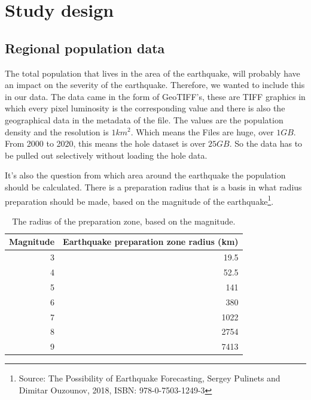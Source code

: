 \documentclass[a4paper]{article}
\begin{document}

\section{Study design}

\subsection{Regional population data}

The total population that lives in the area of the earthquake, will probably have an impact on the severity of the earthquake. Therefore, we wanted to include this in our data. The data came in the form of GeoTIFF's, these are TIFF graphics in which every pixel luminosity is the corresponding value and there is also the geographical data in the metadata of the file. The values are the population density and the resolution is $1 km^2$. Which means the Files are huge, over $1 GB$. From 2000 to 2020, this means the hole dataset is over $25 GB$. So the data has to be pulled out selectively without loading the hole data.

It's also the question from which area around the earthquake the population should be calculated. There is a preparation radius that is a basis in what radius preparation should be made, based on the magnitude of the earthquake\footnote{Source: The Possibility of Earthquake Forecasting, Sergey Pulinets and Dimitar Ouzounov, 2018, ISBN: 978-0-7503-1249-3}.

\begin{table}[h]
    \centering
    \caption{The radius of the preparation zone, based on the magnitude.}
    \label{tab:preperation_radius}
    \begin{tabular}{|r|r|}
    \hline
    Magnitude & Earthquake preparation zone radius (km) \\ \hline
    3         & 19.5                                    \\ \hline
    4         & 52.5                                    \\ \hline
    5         & 141                                     \\ \hline
    6         & 380                                     \\ \hline
    7         & 1022                                    \\ \hline
    8         & 2754                                    \\ \hline
    9         & 7413                                    \\ \hline
    \end{tabular}
    \end{table}
\end{document}
